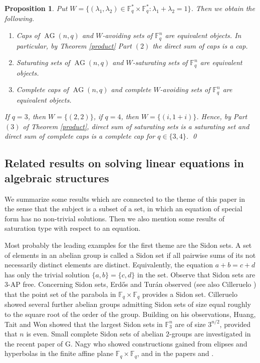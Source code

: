 \documentclass[11pt]{article}
\numberwithin{table}{section}
\newcommand{\F}{{\mathbb F}}
\newtheorem{prop}[theorem]{\bf Proposition}
\theoremstyle{definition}
\DeclareMathOperator{\AG}{{AG}}
\begin{document}
	
	
	\begin{prop}
		Put $W=\{(\lambda_1, \lambda_2) \in \F_q^*\times \F_q^* : \lambda_1+\lambda_2=1\}$. Then we obtain the following.
		\begin{enumerate}[\rm(1)]
			\item Caps of $\AG(n,q)$ and $W$-avoiding sets of $\F_q^n$ are equivalent objects. In particular, by Theorem \ref{product} Part $(2)$ the direct sum of caps is a cap.  
			\item Saturating sets of $\AG(n,q)$ and $W$-saturating sets of $\F_q^n$ are equivalent objects.
			\item Complete caps of $\AG(n,q)$ and complete $W$-avoiding sets of $\F_q^n$ are equivalent objects.
		\end{enumerate}
		If $q=3$, then $W=\{(2,2)\}$, if $q=4$, then 
		$W=\{(i,1+i)\}$. Hence, by Part $(3)$ of Theorem \ref{product}, direct sum of saturating sets is a saturating set and direct sum of complete caps is a complete cap for $q\in \{3,4\}$.  \qed
	\end{prop}
	
	
	
	\subsection{Related results on solving linear equations in algebraic structures}
	
	We summarize some results which are connected to the theme of this paper in the sense that the subject is a subset of a set, in which an equation of special form has no non-trivial solutions. Then we also mention some results of saturation type with respect to an equation.%
	
	Most probably the leading examples for the first theme are the Sidon sets.
	A set of elements in an abelian group is called a Sidon set if all pairwise sums of its not necessarily distinct elements are distinct. Equivalently, the equation 
	$a+b=c+d$  has only the trivial solution 
	$\{a, b\}= \{c,d\}$ in the set. Observe that Sidon sets are $3$-$\mathrm{AP}$ free.
	Concerning Sidon sets, Erdős and Turán  observed  \cite{ET} (see also Cilleruelo  \cite{Cille}) that the point set of the parabola in $\F_q\times \F_q$ provides a Sidon set. Cilleruelo showed several further abelian groups admitting Sidon sets of size equal roughly to the square root of the order of the group.  Building on his observations, Huang, Tait and Won showed \cite{Tait} that the largest Sidon sets in $\F_3^n$ are of size $3^{n/2}$, provided that $n$ is even.
	Small complete Sidon sets of abelian $2$-groups are investigated in the recent paper of G. Nagy \cite{GNagy} who showed constructions gained from elipses and hyperbolas in the finite affine plane $\F_q\times \F_q$, and in the papers \cite{Pott} and \cite{red}.
	
\end{document}
